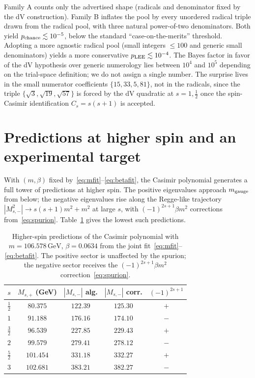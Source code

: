 \documentclass[twocolumn,aps,prd,floatfix,nofootinbib,superscriptaddress,10pt]{article}
\newcommand{\GeV}{\,\mathrm{GeV}}
\begin{document}
Family A counts only the advertised shape (radicals and denominator fixed by the dV construction).  Family B inflates the pool by every unordered radical triple drawn from the radical pool, with three natural power-of-two denominators.  Both yield $p_{\rm chance}\lesssim 10^{-5}$, below the standard ``case-on-the-merits'' threshold.  Adopting a more agnostic radical pool (small integers $\le 100$ and generic small denominators) yields a more conservative $p_{\rm LEE}\lesssim 10^{-4}$.  The Bayes factor in favor of the dV hypothesis over generic numerology lies between $10^4$ and $10^5$ depending on the trial-space definition; we do not assign a single number.  The surprise lives in the small numerator coefficients $\{15,33,5,81\}$, not in the radicals, since the triple $\{\sqrt 3,\sqrt{19},\sqrt{57}\}$ is forced by the dV quadratic at $s=1,\tfrac12$ once the spin-Casimir identification $C_s=s(s+1)$ is accepted.

\section{Predictions at higher spin and an experimental target}
\label{sec:highers}

With $(m,\beta)$ fixed by~\eqref{eq:mfit}--\eqref{eq:betafit}, the Casimir polynomial generates a full tower of predictions at higher spin. The positive eigenvalues approach $m_{\rm gauge}$ from below; the negative eigenvalues rise along the Regge-like trajectory $|M^2_{s,-}|\to s(s+1)m^2+m^2$ at large $s$, with $(-1)^{2s+1}\beta m^2$ corrections from~\eqref{eq:spurion}. Table~\ref{tab:highers} gives the lowest such predictions.

\begin{table}[t]
\centering
\caption{Higher-spin predictions of the Casimir polynomial with $m=106.578\GeV$, $\beta=0.0634$ from the joint fit~\eqref{eq:mfit}--\eqref{eq:betafit}. The positive sector is unaffected by the spurion; the negative sector receives the $(-1)^{2s+1}\beta m^2$ correction~\eqref{eq:spurion}.}
\label{tab:highers}
\begin{tabular}{ccccc}
\toprule
$s$ & $M_{s,+}$ (GeV) & $|M_{s,-}|$ alg. & $|M_{s,-}|$ corr. & $(-1)^{2s+1}$ \\
\midrule
$\tfrac12$ & $80.375$ & $122.39$ & $125.30$ & $+$ \\
$1$  & $91.188$ & $176.16$ & $174.10$ & $-$ \\
$\tfrac32$ & $96.539$ & $227.85$ & $229.43$ & $+$ \\
$2$  & $99.579$ & $279.41$ & $278.12$ & $-$ \\
$\tfrac52$ & $101.454$ & $331.18$ & $332.27$ & $+$ \\
$3$  & $102.681$ & $383.21$ & $382.27$ & $-$ \\
\bottomrule
\end{tabular}
\end{table}
\end{document}
